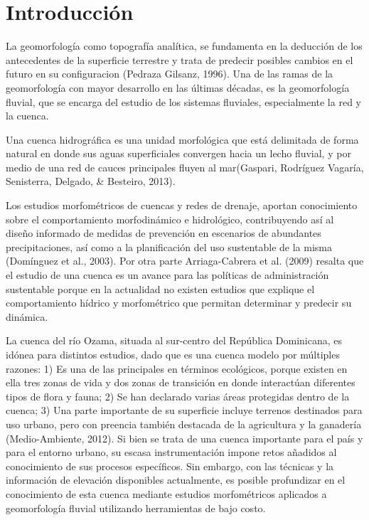 \documentclass[11pt,]{article}
\begin{document}
\vskip 6.5pt


\noindent  \section{Introducción}\label{introducciuxf3n}

La geomorfología como topografía analítica, se fundamenta en la
deducción de los antecedentes de la superficie terrestre y trata de
predecir posibles cambios en el futuro en su configuracion (Pedraza
Gilsanz, 1996). Una de las ramas de la geomorfología con mayor
desarrollo en las últimas décadas, es la geomorfología fluvial, que se
encarga del estudio de los sistemas fluviales, especialmente la red y la
cuenca.

Una cuenca hidrográfica es una unidad morfológica que está delimitada de
forma natural en donde sus aguas superficiales convergen hacia un lecho
fluvial, y por medio de una red de cauces principales fluyen al
mar(Gaspari, Rodríguez Vagaría, Senisterra, Delgado, \& Besteiro, 2013).

Los estudios morfométricos de cuencas y redes de drenaje, aportan
conocimiento sobre el comportamiento morfodinámico e hidrológico,
contribuyendo así al diseño informado de medidas de prevención en
escenarios de abundantes precipitaciones, así como a la planificación
del uso sustentable de la misma (Domínguez et al., 2003). Por otra parte
Arriaga-Cabrera et al. (2009) resalta que el estudio de una cuenca es un
avance para las políticas de administración sustentable porque en la
actualidad no existen estudios que explique el comportamiento hídrico y
morfométrico que permitan determinar y predecir su dinámica.

La cuenca del río Ozama, situada al sur-centro del República Dominicana,
es idónea para distintos estudios, dado que es una cuenca modelo por
múltiples razones: 1) Es una de las principales en términos ecológicos,
porque existen en ella tres zonas de vida y dos zonas de transición en
donde interactúan diferentes tipos de flora y fauna; 2) Se han declarado
varias áreas protegidas dentro de la cuenca; 3) Una parte importante de
su superficie incluye terrenos destinados para uso urbano, pero con
preencia también destacada de la agricultura y la ganadería
(Medio-Ambiente, 2012). Si bien se trata de una cuenca importante para
el país y para el entorno urbano, su escasa instrumentación impone retos
añadidos al conocimiento de sus procesos específicos. Sin embargo, con
las técnicas y la información de elevación disponibles actualmente, es
posible profundizar en el conocimiento de esta cuenca mediante estudios
morfométricos aplicados a geomorfología fluvial utilizando herramientas
de bajo costo.
\end{document}
